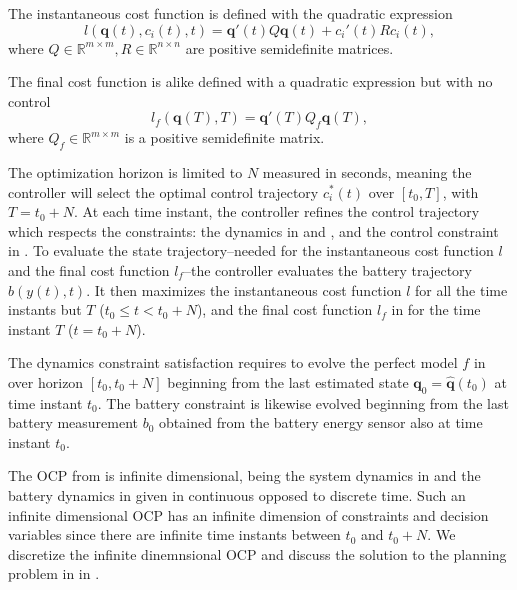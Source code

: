 The instantaneous cost function is defined with the quadratic expression
\begin{equation}\label{eq:insta-cost-mpc}
  l(\mathbf{q}(t),c_i(t),t)=\mathbf{q}'(t)Q\mathbf{q}(t)+c_i'(t)Rc_i(t),
\end{equation}
where $Q\in\mathbb{R}^{m\times m},R\in\mathbb{R}^{n\times n}$ are positive semidefinite matrices.

The final cost function is alike defined with a quadratic expression but with no control
\begin{equation}\label{eq:final-cost-mpc}
  l_f(\mathbf{q}(T),T)=\mathbf{q}'(T)Q_f\mathbf{q}(T),
\end{equation}
where $Q_f\in\mathbb{R}^{m\times m}$ is a positive semidefinite matrix. %

The optimization horizon is limited to $N$ measured in seconds, meaning the controller will select the optimal control trajectory $c_i^*(t)$ over $[t_0,T]$, with $T=t_0+N$. At each time instant, the controller refines the control trajectory which respects the constraints: the dynamics in  and , and the control constraint in . To evaluate the state trajectory--needed for the instantaneous cost function $l$ and the final cost function $l_f$--the controller evaluates the battery trajectory $b(y(t),t)$. It then maximizes the instantaneous cost function $l$ for all the time instants but $T$ ($t_0\leq t < t_0+N$), and the final cost function $l_f$ in  for the time instant $T$ ($t=t_0+N$).

The dynamics constraint satisfaction requires to evolve the perfect model $f$ in  over horizon $[t_0,t_0+N]$ beginning from the last estimated state $\mathbf{q}_0=\hat{\mathbf{q}}(t_0)$ at time instant $t_0$. The battery constraint is likewise evolved beginning from the last battery measurement $b_0$ obtained from the battery energy sensor also at time instant $t_0$.

The OCP from  is infinite dimensional, being the system dynamics in  and the battery dynamics in  given in continuous opposed to discrete time. Such an infinite dimensional OCP has an infinite dimension of constraints and decision variables since there are infinite time instants between $t_0$ and $t_0+N$. We discretize the infinite dinemnsional OCP and discuss the solution to the planning problem in  in .

